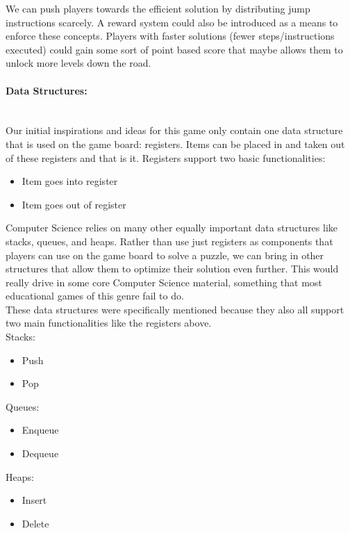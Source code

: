 We can push players towards the efficient solution by distributing jump instructions scarcely.
A reward system could also be introduced as a means to enforce these concepts. Players with
faster solutions (fewer steps/instructions executed) could gain some sort of point based
score that maybe allows them to unlock more levels down the road.\\

\paragraph{Data Structures:} ~\\
Our initial inspirations and ideas for this game only contain one data structure that is
used on the game board: registers. Items can be placed in and taken out of these registers and that
is it. Registers support two basic functionalities:
\begin{itemize}
	\item Item goes into register
	\item Item goes out of register
\end{itemize}

Computer Science relies on many other equally important data structures like stacks,
queues, and heaps. Rather than use just registers as components that players can use on
the game board to solve a puzzle, we can bring in other structures that allow them to
optimize their solution even further. This would really drive in some core Computer Science
material, something that most educational games of this genre fail to do.\\

These data structures were specifically mentioned because they also
all support two main functionalities like the registers above.\\

Stacks:
\begin{itemize}
  \item Push
  \item Pop
\end{itemize}

Queues:
\begin{itemize}
  \item Enqueue
  \item Dequeue
\end{itemize}

Heaps:
\begin{itemize}
  \item Insert
  \item Delete
\end{itemize}

